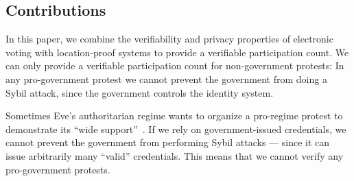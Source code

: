 \subsection{Contributions}

In this paper, we combine the verifiability and privacy properties of 
electronic voting with location-proof systems to provide a verifiable 
participation count.
We can only provide a verifiable participation count for non-government 
protests:
In any pro-government protest we cannot prevent the government from doing a 
Sybil attack, since the government controls the identity system.



Sometimes Eve's authoritarian regime wants to organize a pro-regime protest to 
demonstrate its \enquote{wide 
  support}~\cite[e.g.][]{AlJazeeraOnVenezuela2017,VenezuelanStateWorkersCalledToParticipate}.
If we rely on government-issued credentials, we cannot prevent the government 
from performing Sybil attacks --- since it can issue arbitrarily many 
\enquote{valid} credentials.
This means that we cannot verify any pro-government protests.

